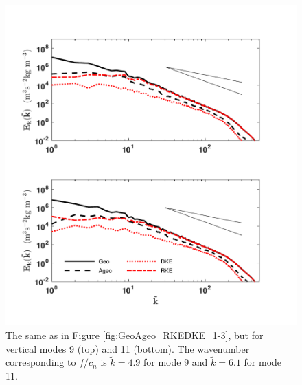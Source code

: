 \begin{figure}[H]
\includegraphics[scale=1]{Chapter4/img/GeoAgeo_RKEDKE_9-11}
\caption{The same as in Figure \ref{fig:GeoAgeo_RKEDKE_1-3}, but for vertical modes 9 (top) and 11 (bottom).  The wavenumber corresponding to $f/c_n$ is $\tilde{k} = 4.9$ for mode 9 and $\tilde{k} = 6.1$ for mode 11.}
\label{fig:GeoAgeo_RKEDKE_9-11}
\end{figure}

